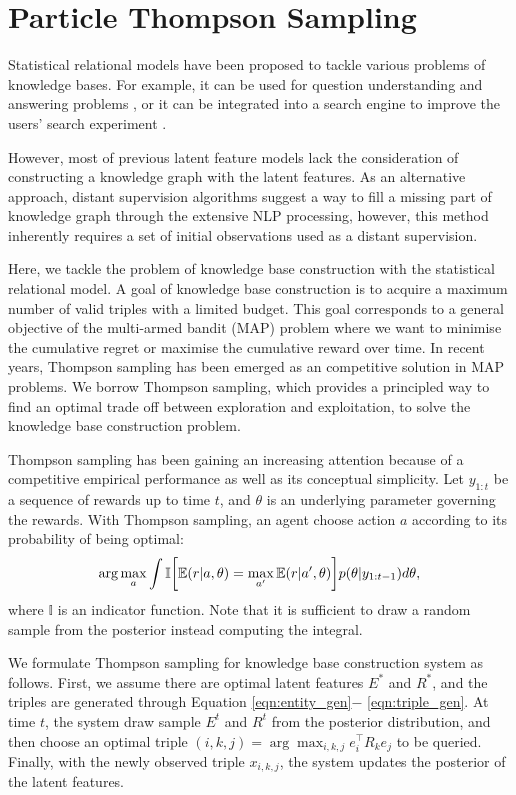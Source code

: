\section{Particle Thompson Sampling}
Statistical relational models have been proposed to tackle
various problems of knowledge bases. For example, it can be used 
for question understanding and answering problems \cite{Dong2015},
or it can be integrated into a search engine
to improve the users' search experiment \cite{dong2014knowledge}.

However, most of previous latent feature models lack the consideration
of constructing a knowledge graph with the latent features.
As an alternative approach, distant supervision algorithms
\cite{Mintz2009} suggest a way to fill a missing part of knowledge graph
through the extensive NLP processing, however, this method inherently
requires a set of initial observations used as a distant supervision.

Here, we tackle the problem of knowledge base construction with the
statistical relational model.
A goal of knowledge base construction is to acquire a maximum number
of valid triples with a limited budget.
This goal corresponds to a general objective of the multi-armed bandit (MAP)
problem where we want to minimise the cumulative regret or maximise
the cumulative reward over time. 
In recent years, Thompson sampling has been emerged as  
an competitive solution in MAP problems.
We borrow Thompson sampling, which provides a principled
way to find an optimal trade off between exploration and exploitation,
to solve the knowledge base construction problem.

Thompson sampling has been gaining an increasing attention 
because of a competitive empirical performance as well as its conceptual 
simplicity. Let $y_{1:t}$ be a sequence of rewards up to time $t$, and $\theta$ is an underlying parameter governing the rewards. With Thompson sampling, an agent choose action $a$ according to its probability of being optimal:
\begin{align}
\arg\max_a \int \mathbb{I}\bigg[ \mathbb{E}(r|a, \theta) 
= \max_{a'}\mathbb{E}(r|a',\theta) \bigg] p(\theta|y_{1:t-1}) d\theta, \notag
\end{align}
where $\mathbb{I}$ is an indicator function. Note that it is sufficient 
to draw a random sample from the posterior instead computing the integral.

We formulate Thompson sampling for knowledge base construction
system as follows. 
First, we assume there are optimal latent features $E^*$ and $R^*$, and 
the triples are generated through Equation \ref{eqn:entity_gen}$-$
\ref{eqn:triple_gen}. At time $t$, the system draw sample $E^t$ and $R^t$ 
from the posterior distribution, and then choose an optimal triple $(i,k,j) 
= \arg\max_{i,k,j} e_i^\top R_k e_j$ to be queried. Finally, with the newly
observed triple $x_{i,k,j}$, the system updates the posterior of the latent 
features.

